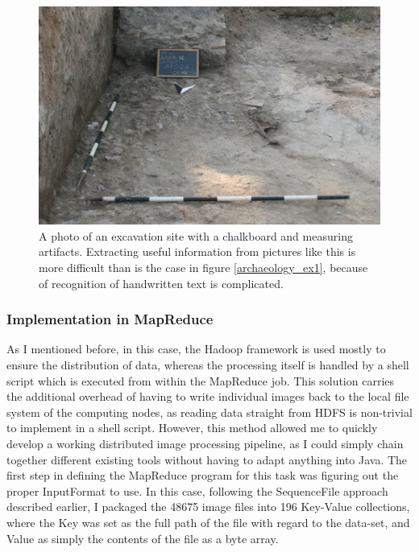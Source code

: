 \documentclass [12pt,a4paper]{report}
\begin{document}
\begin{center}
\begin{figure}[h]
\centering
\includegraphics[scale=0.5]{archaeology_ex2.eps} %
\caption[A photo of an excavation site]{A photo of an excavation site with a chalkboard and measuring artifacts. Extracting useful information from pictures like this is more difficult than is the case in figure \ref{archaeology_ex1}, because of recognition of handwritten text is complicated. }
\label{archaeology_ex2}
\end{figure}
\end{center}

\subsubsection{Implementation in MapReduce}

As I mentioned before, in this case, the Hadoop framework is used mostly to ensure the distribution of data, whereas the processing itself is handled by a shell script which is executed from within the MapReduce job. This solution carries the additional overhead of having to write individual images back to the local file system of the computing nodes, as reading data straight from HDFS is non-trivial to implement in a shell script. However, this method allowed me to quickly develop a working distributed image processing pipeline, as I could simply chain together different existing tools without having to adapt anything into Java.
The first step in defining the MapReduce program for this task was figuring out the proper InputFormat to use. In this case, following the SequenceFile approach described earlier, I packaged the 48675 image files into 196 Key-Value collections, where the Key was set as the full path of the file with regard to the data-set, and Value as simply the contents of the file as a byte array.
\end{document}
